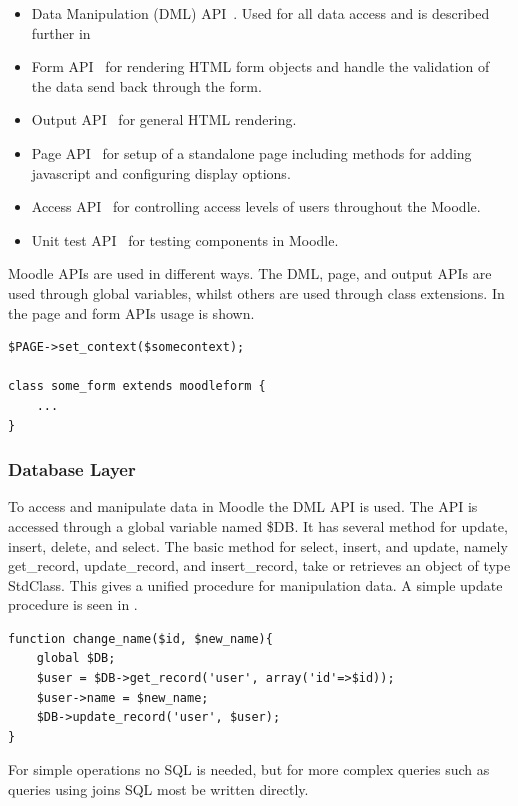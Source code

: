 \begin{itemize}
	\item Data Manipulation (DML) API~\cite{moodledml}. Used for all data access and is described further in 
	\item Form API~\cite{moodleformapi} for rendering HTML form objects and handle the validation of the data send back through the form. 
	\item Output API~\cite{moodleoutputapi} for general HTML rendering.
	\item Page API~\cite{moodlepageapi} for setup of a standalone page including methods for adding javascript and configuring display options. 
	\item Access API~\cite{moodleaccessapi} for controlling access levels of users throughout the Moodle. 
	\item Unit test API~\cite{moodleunittestapi} for testing components in Moodle. 
\end{itemize}
Moodle APIs are used in different ways. The DML, page, and output APIs are used through global variables, whilst others are used through class extensions. In~ the page and form APIs usage is shown.
\begin{lstlisting}[style=phpCode, caption=\myCaption{Example of the Page and form APIs in Moodle}, label=moodleapiusage]
$PAGE->set_context($somecontext);

class some_form extends moodleform {
	...
}
\end{lstlisting}


\subsubsection{Database Layer}
\label{sec:moodleoplatformdbml}
To access and manipulate data in Moodle the DML API is used.  The API is accessed through a global variable named \$DB. It has several method for update, insert, delete, and select. 
The basic method for select, insert, and update, namely get\_record, update\_record, and insert\_record, take or retrieves an object of type StdClass. This gives a unified procedure for manipulation data. A simple update procedure is seen in .
\begin{lstlisting}[style=phpCode, caption=\myCaption{Example of how to change the name of an user}, label=moodlecodeupdate]
function change_name($id, $new_name){
	global $DB;
	$user = $DB->get_record('user', array('id'=>$id));
	$user->name = $new_name;
	$DB->update_record('user', $user);
}
\end{lstlisting}
For simple operations no SQL is needed, but for more complex queries such as queries using joins SQL most be written directly. 




